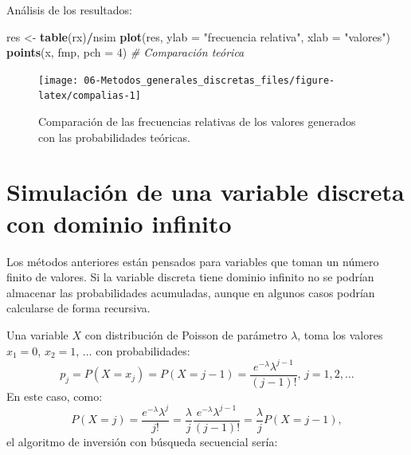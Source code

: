 \documentclass[
]{book}
\newenvironment{Shaded}{\begin{snugshade}}{\end{snugshade}}
\newcommand{\CommentTok}[1]{\textcolor[rgb]{0.56,0.35,0.01}{\textit{#1}}}
\newcommand{\DataTypeTok}[1]{\textcolor[rgb]{0.13,0.29,0.53}{#1}}
\newcommand{\DecValTok}[1]{\textcolor[rgb]{0.00,0.00,0.81}{#1}}
\newcommand{\KeywordTok}[1]{\textcolor[rgb]{0.13,0.29,0.53}{\textbf{#1}}}
\newcommand{\NormalTok}[1]{#1}
\newcommand{\OperatorTok}[1]{\textcolor[rgb]{0.81,0.36,0.00}{\textbf{#1}}}
\newcommand{\StringTok}[1]{\textcolor[rgb]{0.31,0.60,0.02}{#1}}
\theoremstyle{break}
\theoremstyle{definition}
\theoremstyle{definition}
\theoremstyle{definition}
\theoremstyle{remark}
\let\BeginKnitrBlock\begin \let\EndKnitrBlock\end
\begin{document}
Análisis de los resultados:

\begin{Shaded}
\begin{Highlighting}[]
\NormalTok{res <-}\StringTok{ }\KeywordTok{table}\NormalTok{(rx)}\OperatorTok{/}\NormalTok{nsim}
\KeywordTok{plot}\NormalTok{(res, }\DataTypeTok{ylab =} \StringTok{"frecuencia relativa"}\NormalTok{, }\DataTypeTok{xlab =} \StringTok{"valores"}\NormalTok{)}
\KeywordTok{points}\NormalTok{(x, fmp, }\DataTypeTok{pch =} \DecValTok{4}\NormalTok{)  }\CommentTok{# Comparación teórica}
\end{Highlighting}
\end{Shaded}

\begin{figure}[!htb]

{\centering \texttt{[image: 06-Metodos\_generales\_discretas\_files/figure-latex/compalias-1]} 

}

\caption{Comparación de las frecuencias relativas de los valores generados con las probabilidades teóricas.}\label{fig:compalias}
\end{figure}

\hypertarget{simulaciuxf3n-de-una-variable-discreta-con-dominio-infinito}{%
\section{Simulación de una variable discreta con dominio infinito}\label{simulaciuxf3n-de-una-variable-discreta-con-dominio-infinito}}

Los métodos anteriores están pensados para variables que toman
un número finito de valores.
Si la variable discreta tiene dominio infinito no se podrían
almacenar las probabilidades acumuladas, aunque en algunos casos podrían
calcularse de forma recursiva.

\BeginKnitrBlock{example}[distribución de Poisson]
\protect\hypertarget{exm:unnamed-chunk-22}{}{\label{exm:unnamed-chunk-22} {} }
\EndKnitrBlock{example}

Una variable \(X\) con distribución de Poisson de parámetro \(\lambda\),
toma los valores \(x_{1}=0\), \(x_{2}=1\), \(\ldots\) con probabilidades:
\[p_{j}=P\left( X=x_{j}\right)  =P\left( X=j-1\right)  =\frac{e^{-\lambda
}\lambda^{j-1}}{\left( j-1\right)  !}\text{, }j=1,2,\ldots\]
En este caso, como:
\[P\left( X=j\right)  =\frac{e^{-\lambda}\lambda^{j}}{j!}
=\frac{\lambda}{j}\frac{e^{-\lambda}\lambda^{j-1}}{\left( j-1\right)  !}
=\frac{\lambda}{j}P\left( X=j-1\right),\]
el algoritmo de inversión con búsqueda secuencial sería:
\end{document}
